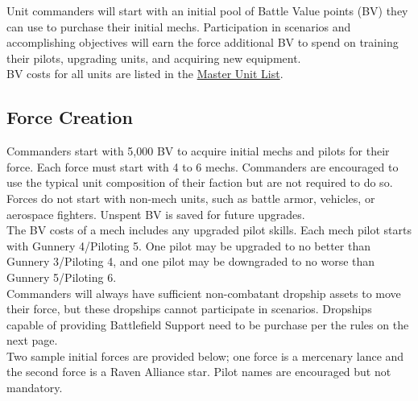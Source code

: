 \documentclass[UTF8]{article}
\begin{document}
Unit commanders will start with an initial pool of Battle Value points (BV) they can use to purchase their initial mechs.
Participation in scenarios and accomplishing objectives will earn the force additional BV to spend on training their pilots, upgrading units, and acquiring new equipment.\\

BV costs for all units are listed in the \href{http://www.masterunitlist.info/}{Master Unit List}.\\

\subsection{Force Creation}

Commanders start with 5,000 BV to acquire initial mechs and pilots for their force.
Each force must start with 4 to 6 mechs.
Commanders are encouraged to use the typical unit composition of their faction but are not required to do so.
Forces do not start with non-mech units, such as battle armor, vehicles, or aerospace fighters.
Unspent BV is saved for future upgrades.\\

The BV costs of a mech includes any upgraded pilot skills.
Each mech pilot starts with Gunnery 4/Piloting 5.
One pilot may be upgraded to no better than Gunnery 3/Piloting 4, and one pilot may be downgraded to no worse than Gunnery 5/Piloting 6.\\

Commanders will always have sufficient non-combatant dropship assets to move their force, but these dropships cannot participate in scenarios.
Dropships capable of providing Battlefield Support need to be purchase per the rules on the next page.\\

Two sample initial forces are provided below; one force is a mercenary lance and the second force is a Raven Alliance star.
Pilot names are encouraged but not mandatory.\\
\end{document}
